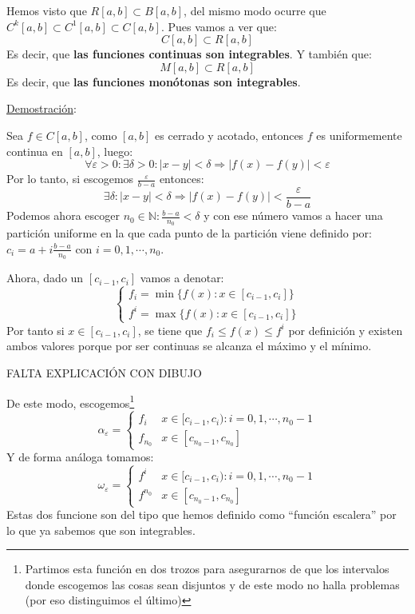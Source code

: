 \documentclass[10pt,a4paper,openright]{book}
\begin{document}
Hemos visto que $R[a,b]\subset B[a,b]$, del mismo modo ocurre que $C^k[a,b]\subset C^{1}[a,b]\subset C[a,b]$. Pues vamos a ver que:
$$C[a,b]\subset R[a,b]$$
Es decir, que \textbf{las funciones continuas son integrables}.
Y también que:
$$M[a,b]\subset R[a,b]$$
Es decir, que \textbf{las funciones monótonas son integrables}.

\underline{Demostración}:

Sea $f\in C[a,b]$, como $[a,b]$ es cerrado y acotado, entonces $f$ es uniformemente continua en $[a,b]$, luego:
$$\forall \varepsilon > 0: \exists \delta> 0: |x-y|<\delta\Rightarrow |f(x)-f(y)|<\varepsilon$$
Por lo tanto, si escogemos $\frac{\varepsilon}{b-a}$ entonces:
$$\exists \delta : |x-y|<\delta \Rightarrow |f(x)-f(y)|<\frac{\varepsilon}{b-a}$$
Podemos ahora escoger $n_0\in \mathbb N: \frac{b-a}{n_0}<\delta$ y con ese número vamos a hacer una partición uniforme en la que cada punto de la partición viene definido por: $c_i = a+ i \frac{b-a}{n_0}$ con $i = 0, 1, \cdots , n_0$.

Ahora, dado un $[c_{i-1}, c_i]$ vamos a denotar:
$$\begin{cases} f_i = \min\{ f(x): x\in [c_{i-1},c_i]\} \\ f^i = \max\{f(x): x\in [c_{i-1},c_i]\}\end{cases}$$
Por tanto si $x\in [c_{i-1},c_i]$, se tiene que $f_i\leq f(x)\leq f^i$ por definición y existen ambos valores porque por ser continuas se alcanza el máximo y el mínimo.

FALTA EXPLICACIÓN CON DIBUJO

De este modo, escogemos\footnote{Partimos esta función en dos trozos para asegurarnos de que los intervalos donde escogemos las cosas sean disjuntos y de este modo no halla problemas (por eso distinguimos el último)}
$$\alpha_\varepsilon = \begin{cases} f_i & x\in [c_{i-1},c_i): i = 0,1,\cdots , n_0-1 \\ f_{n_0}  & x\in[c_{n_0-1},c_{n_0}] \end{cases}$$
Y de forma análoga tomamos:
$$\omega_\varepsilon = \begin{cases} f^{i} & x\in [c_{i-1},c_i): i = 0,1,\cdots , n_0-1 \\ f^{n_0}  & x\in[c_{n_0-1},c_{n_0}] \end{cases}$$
Estas dos funcione son del tipo que hemos definido como ``función escalera'' por lo que ya sabemos que son integrables.
\end{document}
